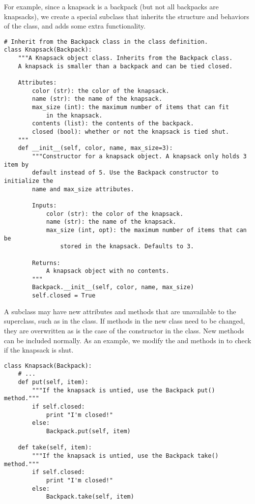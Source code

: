 For example, since a knapsack is a backpack (but not all backpacks are knapsacks), we create a special  subclass that inherits the structure and behaviors of the  class, and adds some extra functionality.

\begin{lstlisting}
# Inherit from the Backpack class in the class definition.
class Knapsack(Backpack):
    """A Knapsack object class. Inherits from the Backpack class.
    A knapsack is smaller than a backpack and can be tied closed.
    
    Attributes:
        color (str): the color of the knapsack.
        name (str): the name of the knapsack.
        max_size (int): the maximum number of items that can fit
            in the knapsack.
        contents (list): the contents of the backpack.
        closed (bool): whether or not the knapsack is tied shut.
    """
    def __init__(self, color, name, max_size=3):
        """Constructor for a knapsack object. A knapsack only holds 3 item by
        default instead of 5. Use the Backpack constructor to initialize the
        name and max_size attributes.
        
        Inputs:
            color (str): the color of the knapsack.
            name (str): the name of the knapsack.
            max_size (int, opt): the maximum number of items that can be
                stored in the knapsack. Defaults to 3.
        
        Returns:
            A knapsack object with no contents.
        """
        Backpack.__init__(self, color, name, max_size)
        self.closed = True
\end{lstlisting}

A subclass may have new attributes and methods that are unavailable to the superclass, such as  in the  class.
If methods in the new class need to be changed, they are overwritten as is the case of the constructor in the  class.
New methods can be included normally.
As an example, we modify the  and  methods in  to check if the knapsack is shut.

\begin{lstlisting}
class Knapsack(Backpack):
    # ...
    def put(self, item):
        """If the knapsack is untied, use the Backpack put() method."""
        if self.closed:
            print "I'm closed!"
        else:
            Backpack.put(self, item)
    
    def take(self, item):
        """If the knapsack is untied, use the Backpack take() method."""
        if self.closed:
            print "I'm closed!"
        else:
            Backpack.take(self, item)
\end{lstlisting}

